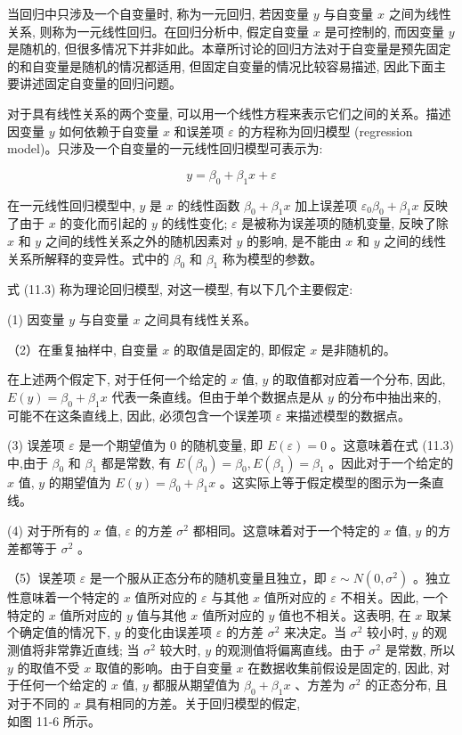 \documentclass[10pt]{article}
\begin{document}
\begin{CJK*}{UTF8}{bsmi}
当回归中只涉及一个自变量时, 称为一元回归, 若因变量 $y$ 与自变量 $x$ 之间为线性关系, 则称为一元线性回归。在回归分析中, 假定自变量 $x$ 是可控制的, 而因变量 $y$ 是随机的, 但很多情况下并非如此。本章所讨论的回归方法对于自变量是预先固定的和自变量是随机的情况都适用, 但固定自变量的情况比较容易描述, 因此下面主要讲述固定自变量的回归问题。

对于具有线性关系的两个变量, 可以用一个线性方程来表示它们之间的关系。描述因变量 $y$ 如何依赖于自变量 $x$ 和误差项 $\varepsilon$ 的方程称为回归模型 (regression model)。只涉及一个自变量的一元线性回归模型可表示为:


\begin{equation*}
y=\beta_{0}+\beta_{1} x+\varepsilon \tag{11.3}
\end{equation*}


在一元线性回归模型中, $y$ 是 $x$ 的线性函数 $\beta_{0}+\beta_{1} x$ 加上误差项 $\varepsilon_{0} \beta_{0}+\beta_{1} x$ 反映了由于 $x$ 的变化而引起的 $y$ 的线性变化; $\varepsilon$ 是被称为误差项的随机变量, 反映了除 $x$ 和 $y$ 之间的线性关系之外的随机因素对 $y$ 的影响, 是不能由 $x$ 和 $y$ 之间的线性关系所解释的变异性。式中的 $\beta_{0}$ 和 $\beta_{1}$ 称为模型的参数。

式 (11.3) 称为理论回归模型, 对这一模型, 有以下几个主要假定:

(1) 因变量 $y$ 与自变量 $x$ 之间具有线性关系。

（2）在重复抽样中, 自变量 $x$ 的取值是固定的, 即假定 $x$ 是非随机的。

在上述两个假定下, 对于任何一个给定的 $x$ 值, $y$ 的取值都对应着一个分布, 因此, $E(y)=\beta_{0}+\beta_{1} x$ 代表一条直线。但由于单个数据点是从 $y$ 的分布中抽出来的, 可能不在这条直线上, 因此, 必须包含一个误差项 $\varepsilon$ 来描述模型的数据点。

(3) 误差项 $\varepsilon$ 是一个期望值为 0 的随机变量, 即 $E(\varepsilon)=0$ 。这意味着在式 (11.3) 中,由于 $\beta_{0}$ 和 $\beta_{1}$ 都是常数, 有 $E\left(\beta_{0}\right)=\beta_{0}, E\left(\beta_{1}\right)=\beta_{1}$ 。因此对于一个给定的 $x$ 值, $y$ 的期望值为 $E(y)=\beta_{0}+\beta_{1} x$ 。这实际上等于假定模型的图示为一条直线。

(4) 对于所有的 $x$ 值, $\varepsilon$ 的方差 $\sigma^{2}$ 都相同。这意味着对于一个特定的 $x$ 值, $y$ 的方差都等于 $\sigma^{2}$ 。

（5）误差项 $\varepsilon$ 是一个服从正态分布的随机变量且独立，即 $\varepsilon \sim N\left(0, \sigma^{2}\right)$ 。独立性意味着一个特定的 $x$ 值所对应的 $\varepsilon$ 与其他 $x$ 值所对应的 $\varepsilon$ 不相关。因此, 一个特定的 $x$ 值所对应的 $y$ 值与其他 $x$ 值所对应的 $y$ 值也不相关。这表明, 在 $x$ 取某个确定值的情况下, $y$ 的变化由误差项 $\varepsilon$ 的方差 $\sigma^{2}$ 来决定。当 $\sigma^{2}$ 较小时, $y$ 的观测值将非常靠近直线; 当 $\sigma^{2}$ 较大时, $y$ 的观测值将偏离直线。由于 $\sigma^{2}$ 是常数, 所以 $y$ 的取值不受 $x$ 取值的影响。由于自变量 $x$ 在数据收集前假设是固定的, 因此, 对于任何一个给定的 $x$ 值, $y$ 都服从期望值为 $\beta_{0}+\beta_{1} x$ 、方差为 $\sigma^{2}$ 的正态分布, 且对于不同的 $x$ 具有相同的方差。关于回归模型的假定,\\
如图 11-6 所示。


\end{CJK*}
\end{document}
